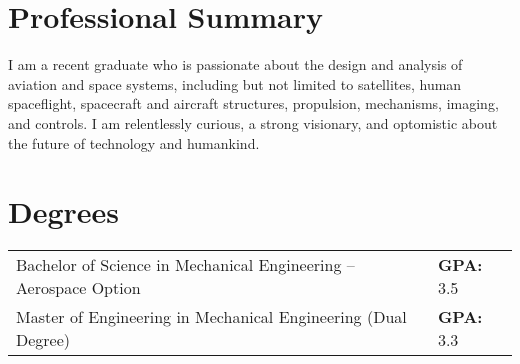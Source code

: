 \documentclass[10pt,final,sans]{resume}
\begin{document}
\setlength\headheight{28pt} %

\section{Professional Summary}
I am a recent graduate who is passionate about the design and analysis of
aviation and space systems, including but not limited to satellites, human
spaceflight, spacecraft and aircraft structures, propulsion, mechanisms,
imaging, and controls. I am relentlessly curious, a strong visionary, and
optomistic about the future of technology and humankind.

\section{Degrees}
\begin{tabular}{ll}
Bachelor of Science in Mechanical Engineering -- Aerospace Option & {\small {\bf GPA: } 3.5} \\
Master of Engineering in Mechanical Engineering (Dual Degree) & {\small {\bf GPA: } 3.3} \\
\end{tabular}
\end{document}

